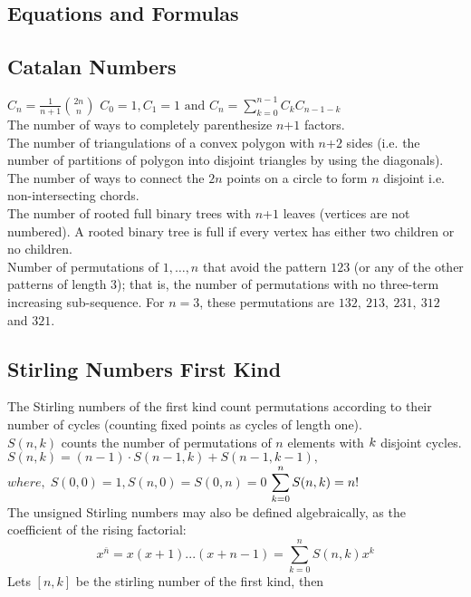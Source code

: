\begin{multicols*}{3}
\newpage
\section{Equations and Formulas}
\subsection{Catalan Numbers}
$\displaystyle C_n=\frac{1}{n+1}{2n \choose n}$
$\displaystyle C_0=1,C_1=1\text{ and }C_n=\sum \limits_{k=0}^{n-1}C_k C_{n-1-k}$ \\
The number of ways to completely parenthesize $n$+$\displaystyle 1$ factors. \\
The number of triangulations of a convex polygon with $n$+$\displaystyle 2$ sides (i.e. the number of partitions of polygon into disjoint triangles by using the diagonals). \\
The number of ways to connect the $\displaystyle 2n$ points on a circle to form $n$ disjoint i.e. non-intersecting chords. \\
The number of rooted full binary trees with $n$+$\displaystyle 1$ leaves (vertices are not numbered). A rooted binary tree is full if every vertex has either two children or no children. \\
Number of permutations of $\displaystyle {1, …, n}$ that avoid the pattern $\displaystyle 123$ (or any of the other patterns of length $3$); that is, the number of permutations with no three-term increasing sub-sequence. For $n = 3$, these permutations are $\displaystyle 132,\ 213,\ 231,\ 312$ and $321.$

\subsection{Stirling Numbers First Kind}
The Stirling numbers of the first kind count permutations according to their number of cycles (counting fixed points as cycles of length one). \\
$S(n,k)$ counts the number of permutations of $n$ elements with $\displaystyle \displaystyle k$ disjoint cycles. \\
$S(n,k)=(n-1) \cdot S(n-1,k)+S(n-1,k-1),$ \(where,\; S(0,0)=1,S(n,0)=S(0,n)=0\)
$\displaystyle \displaystyle\sum_{k=0}^{n}S(n,k) = n!$ \\
The unsigned Stirling numbers may also be defined algebraically, as the coefficient of the rising factorial:
\[\displaystyle x^{\bar{n}} = x(x+1)...(x+n-1) = \sum_{k=0}^{n}{ S(n, k) x^k}\]
Lets $[n, k]$ be the stirling number of the first kind, then


\end{multicols*}
